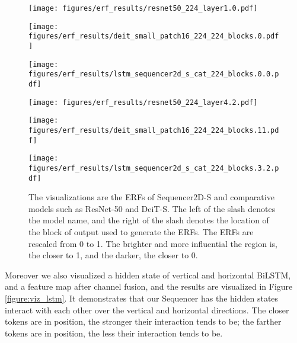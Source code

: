 \documentclass{article}
\begin{document}
\begin{figure}[htb]
  \centering
  \begin{minipage}[b]{0.14\hsize}
    \centering
    \texttt{[image: figures/erf\_results/resnet50\_224\_layer1.0.pdf]}
    \label{figure:erf_resnets}
  \end{minipage}
  \begin{minipage}[b]{0.14\hsize}
    \centering
    \texttt{[image: figures/erf\_results/deit\_small\_patch16\_224\_224\_blocks.0.pdf]}
    \label{figure:erf_deits}
  \end{minipage}
    \begin{minipage}[b]{0.14\hsize}
    \centering
    \texttt{[image: figures/erf\_results/lstm\_sequencer2d\_s\_cat\_224\_blocks.0.0.pdf]}
    \label{figure:erf_seqs}
  \end{minipage}
    \begin{minipage}[b]{0.14\hsize}
    \centering
    \texttt{[image: figures/erf\_results/resnet50\_224\_layer4.2.pdf]}
    \label{figure:erf_resnetd}
  \end{minipage}
    \begin{minipage}[b]{0.14\hsize}
    \centering
    \texttt{[image: figures/erf\_results/deit\_small\_patch16\_224\_224\_blocks.11.pdf]}
    \label{figure:erf_deitd}
  \end{minipage}
    \begin{minipage}[b]{0.14\hsize}
    \centering
    \texttt{[image: figures/erf\_results/lstm\_sequencer2d\_s\_cat\_224\_blocks.3.2.pdf]}
    \label{figure:erf_seqd}
  \end{minipage}
  \caption{The visualizations are the ERFs of Sequencer2D-S and comparative models such as ResNet-50 and DeiT-S. The left of the slash denotes the model name, and the right of the slash denotes the location of the block of output used to generate the ERFs. The ERFs are rescaled from 0 to 1. The brighter and more influential the region is, the closer to 1, and the darker, the closer to 0.}
    \label{figure:erf_main}
\end{figure}

Moreover we also visualized a hidden state of vertical and horizontal BiLSTM, and a feature map after channel fusion, and the results are visualized in Figure \ref{figure:viz_lstm}. It demonstrates that our Sequencer has the hidden states interact with each other over the vertical and horizontal directions. The closer tokens are in position, the stronger their interaction tends to be; the farther tokens are in position, the less their interaction tends to be.
\end{document}
